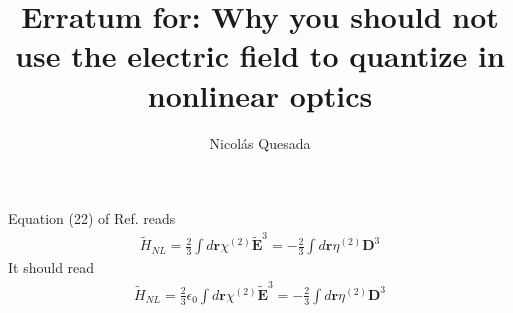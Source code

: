 \documentclass[twocolumn,pra]{revtex4}
\newcommand{\eq}[1]{\begin{align}#1\end{align}}
\begin{document}
\title{Erratum for:  Why you should not use the electric field to quantize in nonlinear optics}
\author{Nicol\'as Quesada}

\maketitle
Equation (22) of Ref. \cite{quesada2017quantize} reads
\eq{
\tilde{H}_{NL} = \frac{2}{3} \int d \mathbf{r} \chi^{(2)} \tilde{\mathbf{E}}^3 = -\frac{2}{3} \int d\mathbf{r} \eta^{(2)} \mathbf{D}^3
}
It should read
\eq{
\tilde{H}_{NL} = \frac{2}{3} \epsilon_0 \int d \mathbf{r} \chi^{(2)} \tilde{\mathbf{E}}^3 = -\frac{2}{3} \int d\mathbf{r} \eta^{(2)} \mathbf{D}^3
}



\end{document}
